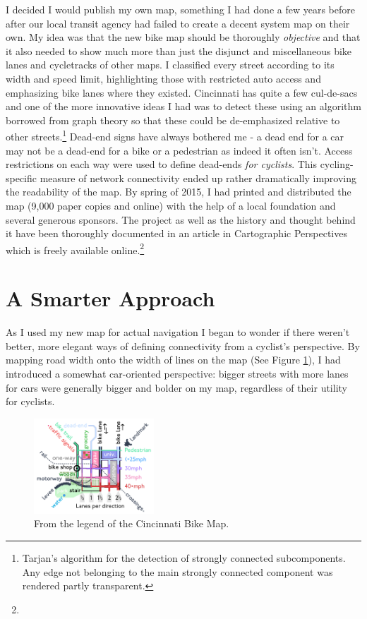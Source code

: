 \documentclass{article}
\begin{document}
		I decided I would publish my own map, something I had done a few years before after our local transit agency had failed to create a decent system map on their own.
		My idea was that the new bike map should be thoroughly \textit{objective} and that it also needed to show much more than just the disjunct and miscellaneous bike lanes and cycletracks of other maps. I classified every street according to its width and speed limit, highlighting those with restricted auto access and emphasizing bike lanes where they existed. Cincinnati has quite a few cul-de-sacs and one of the more innovative ideas I had was to detect these using an algorithm borrowed from graph theory so that these could be de-emphasized relative to other streets.\footnote{
			Tarjan's algorithm for the detection of strongly connected subcomponents. Any edge not belonging to the main strongly connected component was rendered partly transparent.
		} Dead-end signs have always bothered me - a dead end for a car may not be a dead-end for a bike or a pedestrian as indeed it often isn't. Access restrictions on each way were used to define dead-ends \textit{for cyclists}. 
		This cycling-specific measure of network connectivity ended up rather dramatically improving the readability of the map. 
		By spring of 2015, I had printed and distributed the map (9,000 paper copies and online) with the help of a local foundation and several generous sponsors. The project as well as the history and thought behind it have been thoroughly documented in an article in Cartographic Perspectives which is freely available online.\footnote{
		}
	
	\section*{A Smarter Approach}
	
		As I used my new map for actual navigation I began to wonder if there weren't better, more elegant ways of defining connectivity from a cyclist's perspective. By mapping road width onto the width of lines on the map (See Figure \ref{fig:legend}), I had introduced a somewhat car-oriented perspective: bigger streets with more lanes for cars were generally bigger and bolder on my map, regardless of their utility for cyclists. 
		
		\begin{figure}[h!]
			\centering
			\includegraphics[width=0.4\textwidth]{legend}
			\caption{From the legend of the Cincinnati Bike Map.}
			\label{fig:legend}
		\end{figure}
		
\end{document}

